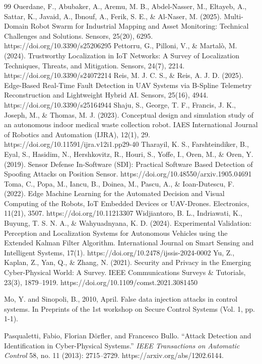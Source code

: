\documentclass[11pt,a4paper]{article}
\begin{document}
\begin{thebibliography}{99}
 Ouerdane, F., Abubaker, A., Aremu, M. B., Abdel-Nasser, M., Eltayeb, A., Sattar, K., Javaid, A., Ibnouf, A., Ferik, S. E., \& Al-Naser, M. (2025). Multi-Domain Robot Swarm for Industrial Mapping and Asset Monitoring: Technical Challenges and Solutions. Sensors, 25(20), 6295. https://doi.org/10.3390/s25206295
 Pettorru, G., Pilloni, V., \& Martalò, M. (2024). Trustworthy Localization in IoT Networks: A Survey of Localization Techniques, Threats, and Mitigation. Sensors, 24(7), 2214. https://doi.org/10.3390/s24072214
 Reis, M. J. C. S., \& Reis, A. J. D. (2025). Edge-Based Real-Time Fault Detection in UAV Systems via B-Spline Telemetry Reconstruction and Lightweight Hybrid AI. Sensors, 25(16), 4944. https://doi.org/10.3390/s25164944
 Shaju, S., George, T. F., Francis, J. K., Joseph, M., \& Thomas, M. J. (2023). Conceptual design and simulation study of an autonomous indoor medical waste collection robot. IAES International Journal of Robotics and Automation (IJRA), 12(1), 29. https://doi.org/10.11591/ijra.v12i1.pp29-40
 Tharayil, K. S., Farshteindiker, B., Eyal, S., Hasidim, N., Hershkovitz, R., Houri, S., Yoffe, I., Oren, M., \& Oren, Y. (2019). Sensor Defense In-Software (SDI): Practical Software Based Detection of Spoofing Attacks on Position Sensor. https://doi.org/10.48550/arxiv.1905.04691
 Toma, C., Popa, M., Iancu, B., Doinea, M., Pascu, A., \& Ioan-Dutescu, F. (2022). Edge Machine Learning for the Automated Decision and Visual Computing of the Robots, IoT Embedded Devices or UAV-Drones. Electronics, 11(21), 3507. https://doi.org/10.11213307
 Widjiantoro, B. L., Indriawati, K., Buyung, T. S. N. A., \& Wahyuadnyana, K. D. (2024). Experimental Validation: Perception and Localization Systems for Autonomous Vehicles using the Extended Kalman Filter Algorithm. International Journal on Smart Sensing and Intelligent Systems, 17(1). https://doi.org/10.2478/ijssis-2024-0002
 Yu, Z., Kaplan, Z., Yan, Q., \& Zhang, N. (2021). Security and Privacy in the Emerging Cyber-Physical World: A Survey. IEEE Communications Surveys \& Tutorials, 23(3), 1879–1919. https://doi.org/10.1109/comst.2021.3081450

 Mo, Y. and Sinopoli, B., 2010, April. False data injection attacks in control systems. In Preprints of the 1st workshop on Secure Control Systems (Vol. 1, pp. 1-1).

Pasqualetti, Fabio, Florian Dörfler, and Francesco Bullo.
``Attack Detection and Identification in Cyber-Physical Systems.''
\textit{IEEE Transactions on Automatic Control} 58, no. 11 (2013): 2715--2729.
https://arxiv.org/abs/1202.6144.


\end{thebibliography}
\end{document}
